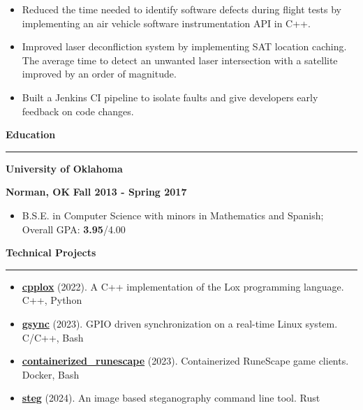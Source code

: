 \documentclass[11pt,letterpaper]{article}
\begin{document}
\begin{itemize}[noitemsep,topsep=0pt]
	\setlength\itemsep{0.2em}
	\item Reduced the time needed to identify software defects during flight
	      tests by implementing an air vehicle software instrumentation API in
	      C++.
	\item Improved laser deconfliction system by implementing SAT location
	      caching. The average time to detect an unwanted laser intersection
	      with a satellite improved by an order of magnitude.
	\item Built a Jenkins CI pipeline to isolate faults and give developers
	      early feedback on code changes.
\end{itemize}

\medskip

\begin{large}
	\textbf{Education}
\end{large}

\smallskip \hrule \medskip

\begin{minipage}[t]{0.5\textwidth}
	\begin{flushleft}
		\textbf{University of Oklahoma}\\

	\end{flushleft}
\end{minipage}
\begin{minipage}[t]{0.46\textwidth}
	\begin{flushright}
    \textbf{Norman, OK} \textbar \space
		\textbf{Fall 2013 - Spring 2017}

	\end{flushright}
\end{minipage}
\begin{itemize}[topsep=0pt]
	\setlength\itemsep{0.2em}
	\item B.S.E. in Computer Science with minors in Mathematics and Spanish;
	      Overall GPA: \textbf{3.95}/{4.00}
\end{itemize}

\medskip

\begin{large}
	\textbf{Technical Projects}
\end{large}

\smallskip \hrule \medskip

\begin{itemize}[topsep=0pt]
	\setlength\itemsep{0.2em}
	\item \textbf{\href{https://github.com/ivan-guerra/cpplox.git}{cpplox}}
	      (2022). A C++ implementation of the Lox programming language. C++,
	      Python
	\item \textbf{\href{https://github.com/ivan-guerra/gsync.git}{gsync}}
	      (2023). GPIO driven synchronization on a real-time Linux system. C/C++,
	      Bash
  \item \textbf{\href{https://github.com/ivan-guerra/containerized_runescape.git}{containerized\_runescape}}
        (2023). Containerized RuneScape game clients. Docker, Bash
	\item \textbf{\href{https://github.com/ivan-guerra/steg.git}{steg}}
	      (2024). An image based steganography command line tool. Rust
\end{itemize}
\end{document}
